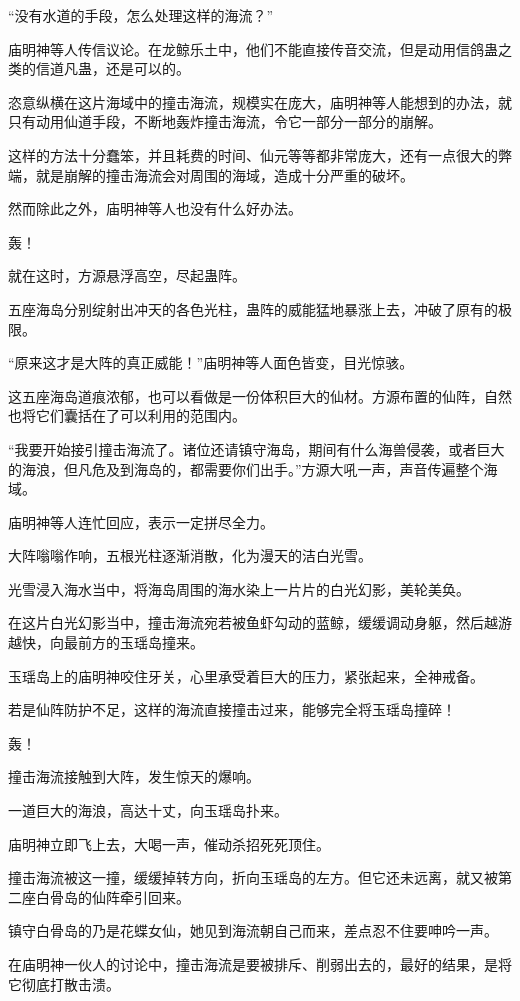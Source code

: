 \begin{this_body}
“没有水道的手段，怎么处理这样的海流？”

庙明神等人传信议论。在龙鲸乐土中，他们不能直接传音交流，但是动用信鸽蛊之类的信道凡蛊，还是可以的。

恣意纵横在这片海域中的撞击海流，规模实在庞大，庙明神等人能想到的办法，就只有动用仙道手段，不断地轰炸撞击海流，令它一部分一部分的崩解。

这样的方法十分蠢笨，并且耗费的时间、仙元等等都非常庞大，还有一点很大的弊端，就是崩解的撞击海流会对周围的海域，造成十分严重的破坏。

然而除此之外，庙明神等人也没有什么好办法。

轰！

就在这时，方源悬浮高空，尽起蛊阵。

五座海岛分别绽射出冲天的各色光柱，蛊阵的威能猛地暴涨上去，冲破了原有的极限。

“原来这才是大阵的真正威能！”庙明神等人面色皆变，目光惊骇。

这五座海岛道痕浓郁，也可以看做是一份体积巨大的仙材。方源布置的仙阵，自然也将它们囊括在了可以利用的范围内。

“我要开始接引撞击海流了。诸位还请镇守海岛，期间有什么海兽侵袭，或者巨大的海浪，但凡危及到海岛的，都需要你们出手。”方源大吼一声，声音传遍整个海域。

庙明神等人连忙回应，表示一定拼尽全力。

大阵嗡嗡作响，五根光柱逐渐消散，化为漫天的洁白光雪。

光雪浸入海水当中，将海岛周围的海水染上一片片的白光幻影，美轮美奂。

在这片白光幻影当中，撞击海流宛若被鱼虾勾动的蓝鲸，缓缓调动身躯，然后越游越快，向最前方的玉瑶岛撞来。

玉瑶岛上的庙明神咬住牙关，心里承受着巨大的压力，紧张起来，全神戒备。

若是仙阵防护不足，这样的海流直接撞击过来，能够完全将玉瑶岛撞碎！

轰！

撞击海流接触到大阵，发生惊天的爆响。

一道巨大的海浪，高达十丈，向玉瑶岛扑来。

庙明神立即飞上去，大喝一声，催动杀招死死顶住。

撞击海流被这一撞，缓缓掉转方向，折向玉瑶岛的左方。但它还未远离，就又被第二座白骨岛的仙阵牵引回来。

镇守白骨岛的乃是花蝶女仙，她见到海流朝自己而来，差点忍不住要呻吟一声。

在庙明神一伙人的讨论中，撞击海流是要被排斥、削弱出去的，最好的结果，是将它彻底打散击溃。


\end{this_body}

